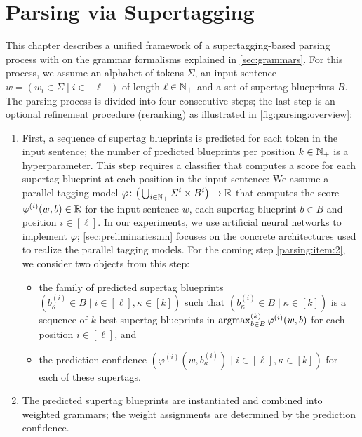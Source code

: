 \documentclass[../document.tex]{subfiles}
\begin{document}
    \chapter{Parsing via Supertagging}\label{chp:parsing}
    This chapter describes a unified framework of a supertagging-based parsing process with on the grammar formalisms explained in \cref{sec:grammars}.
    For this process, we assume an alphabet of tokens \(\varSigma\), an input sentence \(w = (w_i \in \varSigma \mid i \in [\ell])\) of length \(\ell \in \mathbb{N}_+\) and a set of supertag blueprints \(B\).
    The parsing process is divided into four consecutive steps; the last step is an optional refinement procedure (reranking) as illustrated in \cref{fig:parsing:overview}:
    \begin{enumerate}
        \item\label{parsing:item:1}
            First, a sequence of supertag blueprints is predicted for each token in the input sentence; the number of predicted blueprints per position \(k \in \mathbb{N}_+\) is a hyperparameter.
            This step requires a classifier that computes a score for each supertag blueprint at each position in the input sentence:
                We assume a parallel tagging model \(\varphi\colon \big(\bigcup_{i\in \mathbb{N}_+} \varSigma^i \times B^i \big) \to \mathbb{R}\) that computes the score \(\varphi^{(i)}(w, b) \in \mathbb{R}\) for the input sentence \(w\), each supertag blueprint \(b \in B\) and position \(i \in [\ell]\).
            In our experiments, we use artificial neural networks to implement \(\varphi\); \cref{sec:preliminaries:nn} focuses on the concrete architectures used to realize the parallel tagging models.
            For the coming step \ref{parsing:item:2}, we consider two objects from this step:
            \begin{itemize}
                \item the family of predicted supertag blueprints \((b^{(i)}_{\kappa} \in B \mid i \in [\ell], \kappa \in [k])\) such that \((b^{(i)}_{\kappa} \in B \mid \kappa \in [k])\) is a sequence of \(k\) best supertag blueprints in \(\operatorname{arg max}^{(k)}_{b \in B} \varphi^{(i)}(w, b)\) for each position \(i\in [\ell]\), and
                \item the prediction confidence \((\varphi^{(i)}(w, b^{(i)}_{\kappa}) \mid i \in [\ell], \kappa \in [k])\) for each of these supertags.
            \end{itemize}
        \item\label{parsing:item:2}
            The predicted supertag blueprints are instantiated and combined into weighted grammars; the weight assignments are determined by the prediction confidence.

\end{enumerate}
\end{document}
